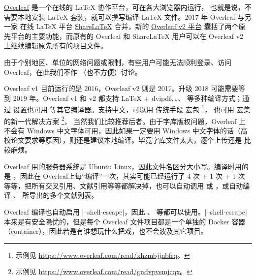 


\href{https://www.overleaf.com}{Overleaf} 是一个在线的 \LaTeX{} 协作平台，可在各大浏览器内运行，
也就是说，不需要本地安装 \LaTeX{} 套装，就可以撰写编译 \LaTeX{} 文件。2017 年 Overleaf 与另一家
在线 \LaTeX{} 平台 \href{https://www.sharelatex.com}{ShareLaTeX} 合并，新的
\href{https://v2.overleaf.com}{Overleaf v2 平台} 囊括了两个原先平台的主要功能，而原有的 Overleaf 和
ShareLaTeX 用户可以在 Overleaf v2 上继续编辑原先所有的项目文件。

由于个别地区、单位的网络问题或限制，有些用户可能无法顺利登录、访问 Overleaf，在此我们不作
（也不方便）讨论。

Overleaf v1 目前运行的是 \TeXLive{} 2016，Overleaf v2 则是 \TeXLive{} 2017。升级 \TeXLive{} 2018
可能需要等到 2019 年。Overleaf v1 和 v2 都支持 \LaTeX{} + dvipdf、\pdfLaTeX{}、\XeLaTeX{}、
\LuaLaTeX{} 等多种编译方式；通过  设置也可用 \pTeX{} 等其它编译器。支持中文，可以用
传统手段  宏包
\footnote{示例见 \url{https://www.overleaf.com/read/xhzmbjjnbfrq}。}，
也可用 \CTeX{} 宏集的新一代解决方案
\footnote{示例见 \url{https://www.overleaf.com/read/gndvpvsmjcqx}。}，
当然我们比较推荐后者。由于字库版权问题，Overleaf 上不会有 Windows 中文字体可用，因此如果一定要用
Windows 中文字体的话（高校论文要求等原因），则还是建议本地编译。毕竟字库文件太大，逐个上传还是
比较麻烦。

Overleaf 用的服务器系统是 Ubuntu Linux，因此文件名区分大小写。编译时用的是 ，因此在
Overleaf上每“编译”一次，其实可能已经运行了 4 次  + 1 次  + 1 次 
等等，把所有交叉引用、文献引用等等都解决掉，也可以自动调用  或 ，或自动编译
、 所导出的多个文献列表。

Overleaf 编译也自动启用 |--shell-escape|，因此 、 
等都可以使用。|--shell-escape| 本来是有安全隐忧的，但是每个 Overleaf 文件项目都是一个单独的 Docker 
容器（container），因此若是有谁想玩什么把戏，也不会波及其它项目。


